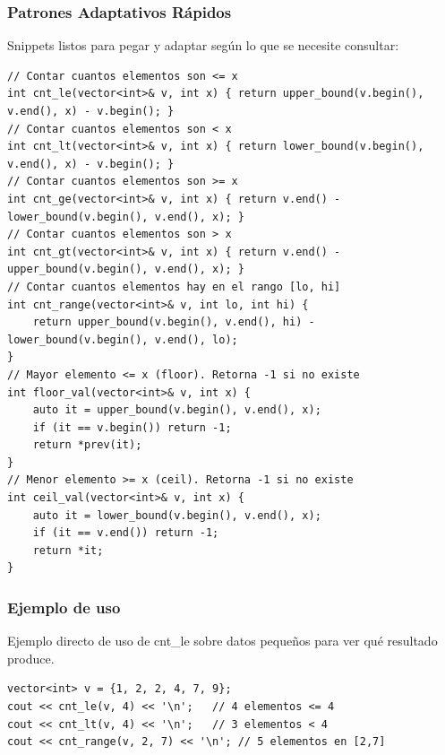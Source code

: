 \documentclass[10pt,twocolumn,letterpaper]{report}
\begin{document}
\subsubsection{Patrones Adaptativos Rápidos}
Snippets listos para pegar y adaptar según lo que se necesite consultar:
\begin{lstlisting}
// Contar cuantos elementos son <= x
int cnt_le(vector<int>& v, int x) { return upper_bound(v.begin(), v.end(), x) - v.begin(); }
// Contar cuantos elementos son < x
int cnt_lt(vector<int>& v, int x) { return lower_bound(v.begin(), v.end(), x) - v.begin(); }
// Contar cuantos elementos son >= x
int cnt_ge(vector<int>& v, int x) { return v.end() - lower_bound(v.begin(), v.end(), x); }
// Contar cuantos elementos son > x
int cnt_gt(vector<int>& v, int x) { return v.end() - upper_bound(v.begin(), v.end(), x); }
// Contar cuantos elementos hay en el rango [lo, hi]
int cnt_range(vector<int>& v, int lo, int hi) {
    return upper_bound(v.begin(), v.end(), hi) - lower_bound(v.begin(), v.end(), lo);
}
// Mayor elemento <= x (floor). Retorna -1 si no existe
int floor_val(vector<int>& v, int x) {
    auto it = upper_bound(v.begin(), v.end(), x);
    if (it == v.begin()) return -1;
    return *prev(it);
}
// Menor elemento >= x (ceil). Retorna -1 si no existe
int ceil_val(vector<int>& v, int x) {
    auto it = lower_bound(v.begin(), v.end(), x);
    if (it == v.end()) return -1;
    return *it;
}
\end{lstlisting}
\subsubsection*{Ejemplo de uso}
Ejemplo directo de uso de cnt\_le sobre datos pequeños para ver qué resultado produce.
\begin{lstlisting}
vector<int> v = {1, 2, 2, 4, 7, 9};
cout << cnt_le(v, 4) << '\n';   // 4 elementos <= 4
cout << cnt_lt(v, 4) << '\n';   // 3 elementos < 4
cout << cnt_range(v, 2, 7) << '\n'; // 5 elementos en [2,7]
\end{lstlisting}
\end{document}
